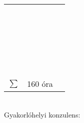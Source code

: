 \documentclass[10pt,a4paper,oneside]{report}
\newcounter{magicrownumbers}
\newcommand\rownum{\stepcounter{magicrownumbers}\arabic{magicrownumbers}}
\begin{document}
\begin{table}[h!]
\begin{tabular}{| c | p{3 cm} | p{10 cm} |}
	\rownum &  &  \\ \hline
	\rownum &  &  \\ \hline
	\rownum &  &  \\ \hline
	\rownum &  &  \\ \hline
	\rownum &  &  \\ \hline
	\rownum &  &  \\ \hline
	\rownum &  &  \\ \hline
	\rownum &  &  \\ \hline
	\rownum &  &  \\ \hline
	\rownum &  &  \\ \hline
	\rownum &  &  \\ \hline
	\rownum &  &  \\ \hline
	\rownum &  &  \\ \hline
	\rownum &  &  \\ \hline
	\rownum &  &  \\ \hline
	\rownum &  &  \\ \hline
	\rownum &  &  \\ \hline
	\rownum &  &  \\ \hline
	\rownum &  &  \\ \hline
	\rownum &  &  \\ \hline
	\rownum &  &  \\ \hline
	\rownum &  &  \\ \hline
	\rownum &  &  \\ \hline
	\rownum &  &  \\ \hline
	\rownum &  &  \\ \hline
	$\sum$ & 160 óra& \\ \hline
	\end{tabular}
\end{table}
\vspace{.5 cm} \\
Gyakorlóhelyi konzulens:
\end{document}
